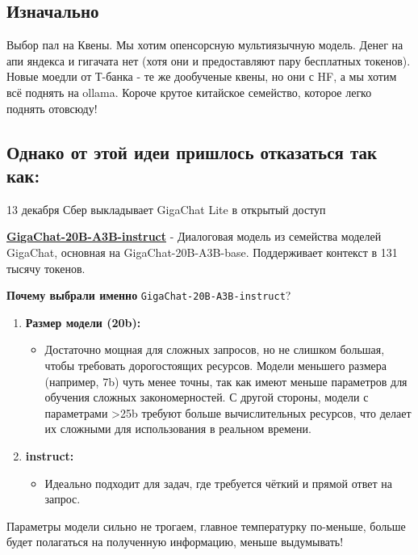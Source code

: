 \documentclass{article}
\begin{document}
\subsection*{Изначально}

Выбор пал на Квены. Мы хотим опенсорсную мультиязычную модель. Денег на апи яндекса и гигачата нет (хотя они и предоставляют пару бесплатных токенов). Новые моедли от Т-банка - те же дообученые квены, но они с HF, а мы хотим всё поднять на ollama. Короче крутое китайское семейство, которое легко поднять отовсюду!

\subsection*{Однако от этой идеи пришлось отказаться так как:}

13 декабря Сбер выкладывает GigaChat Lite в открытый доступ



\textbf{\href{https://huggingface.co/ai-sage/GigaChat-20B-A3B-instruct}{GigaChat-20B-A3B-instruct}} - Диалоговая модель из семейства моделей GigaChat, основная на GigaChat-20B-A3B-base. Поддерживает контекст в 131 тысячу токенов.



\textbf{Почему выбрали именно} \texttt{GigaChat-20B-A3B-instruct}?
\begin{enumerate}
    \item \textbf{Размер модели (20b):}
    \begin{itemize}
        \item Достаточно мощная для сложных запросов, но не слишком большая, чтобы требовать дорогостоящих ресурсов. Модели меньшего размера (например, 7b) чуть менее точны, так как имеют меньше параметров для обучения сложных закономерностей. С другой стороны, модели с параметрами >25b требуют больше вычислительных ресурсов, что делает их сложными для использования в реальном времени. 
    \end{itemize}
    \item \textbf{instruct:}
    \begin{itemize}
        \item Идеально подходит для задач, где требуется чёткий и прямой ответ на запрос. 
    \end{itemize}
\end{enumerate}

Параметры модели сильно не трогаем, главное температурку по-меньше, больше будет полагаться на полученную информацию, меньше выдумывать!
\end{document}
